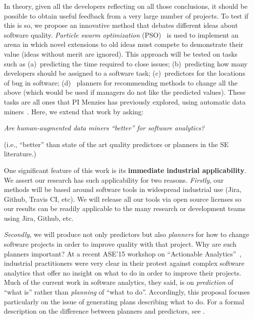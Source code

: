  In theory, given all the developers   reflecting on all those conclusions,  it should be possible to obtain useful feedback from
 a very large number of projects. 
 To test if this is so,  we propose  an innovative  method that debates  different ideas about software quality. {\em Particle swarm optimization} (PSO)~\cite{banks2008review,banks2007review}  is used to implement an arena in which novel extensions to old ideas must
compete to demonstrate their value (ideas without merit are ignored).  
This approach  will be tested on    tasks
such as (a)~predicting the time required to close issues; 
(b)~predicting  how many developers should be assigned to a software task;
(c)~predictors for the locations of bug in software;
(d)~ planners for recommending methods to change all the above (which would be used if managers do not like the predicted values).
These tasks are all ones that  PI Menzies has previously explored, using automatic data miners~\cite{Me13,krishna16,Kr16,rees2017better,Lu12,agrawal17,Me07,Me17}. Here, we extend that
  work by asking:
 
 \begin{center}
{\em Are human-augmented data miners      
 ``better'' for  software  analytics? }
\end{center}
 (i.e.,  ``better'' than  state of the art quality predictors or planners in the SE literature.)

 



 
One significant feature of this work is its
{\bf immediate industrial applicability}. We assert our research has such applicability  for two reasons.
{\em Firstly},
our methods
will be based around software tools in widespread industrial use (Jira, Github, Travis CI, etc).  We will release all our tools via open source licenses so our
results can be  readily applicable to the many research or development teams using Jira, Github, etc.


{\em Secondly}, we will produce not only predictors but also {\em planners}
for how to change software projects in order to improve quality with  that
 project.
 Why are such planners important? At a recent ASE'15 workshop on 
``Actionable Analytics''~\cite{Krishna15a}, industrial practitioners were very
clear in their protest against complex software analytics that offer no insight on what to do in order to improve their projects.
Much of the current work in software analytics, they said,  is on 
{\em prediction} of ``what is'' rather than {\em planning}  of ``what to do''.
 Accordingly, this proposal focuses particularly on the issue of generating plans describing what to do.
   For a formal description on the difference between  planners and predictors,  see  .



